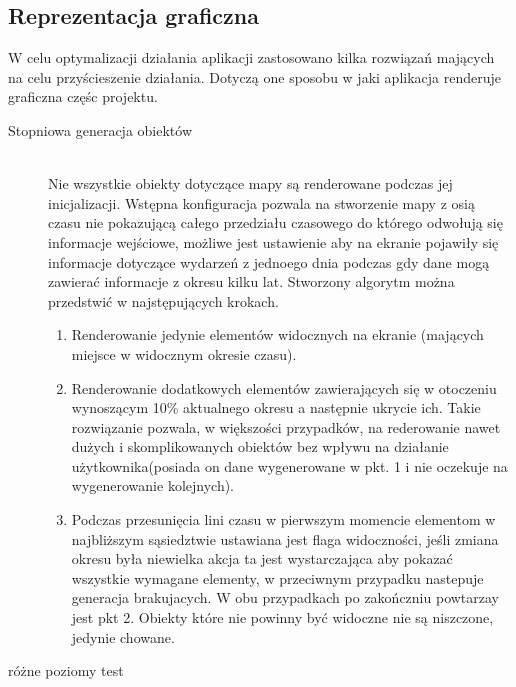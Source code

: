 \subsection{Reprezentacja graficzna}
\label{subsec:showing}

W celu optymalizacji działania aplikacji zastosowano kilka rozwiązań mających na celu przyścieszenie działania. Dotyczą one sposobu w jaki aplikacja renderuje graficzna częśc projektu.


\begin{description}
\item[Stopniowa generacja obiektów]\hfill \\
Nie wszystkie obiekty dotyczące mapy są renderowane podczas jej inicjalizacji. Wstępna konfiguracja pozwala na stworzenie mapy z osią czasu nie pokazującą całego przedziału czasowego do którego odwołują się informacje wejściowe, możliwe jest ustawienie aby na ekranie pojawiły się informacje dotyczące wydarzeń z jednoego dnia podczas gdy dane mogą zawierać informacje z okresu kilku lat. Stworzony algorytm można przedstwić w najstępujących krokach.

\begin{enumerate}
\item
Renderowanie jedynie elementów widocznych na ekranie (mających miejsce w widocznym okresie czasu).

\item
Renderowanie dodatkowych elementów zawierających się w otoczeniu wynoszącym 10\% aktualnego okresu a następnie ukrycie ich. Takie rozwiązanie pozwala, w większości przypadków, na rederowanie nawet dużych i skomplikowanych obiektów bez wpływu na działanie użytkownika(posiada on dane wygenerowane w pkt. 1 i nie oczekuje na wygenerowanie kolejnych).

\item
Podczas przesunięcia lini czasu w pierwszym momencie elementom w najbliższym sąsiedztwie ustawiana jest flaga widoczności, jeśli zmiana okresu była niewielka akcja ta jest wystarczająca aby pokazać wszystkie wymagane elementy, w przeciwnym przypadku nastepuje generacja brakujacych. W obu przypadkach po zakończniu powtarzay jest pkt 2. Obiekty które nie powinny być widoczne nie są niszczone, jedynie chowane.

\end{enumerate}

\item[różne poziomy test]\hfill \\

\end{description}

